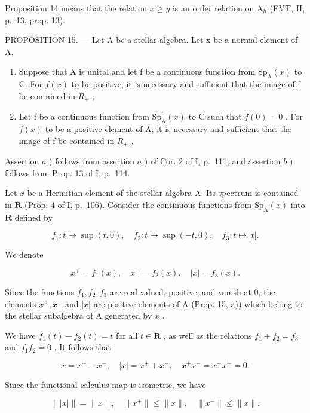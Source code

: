 Proposition 14 means that the relation \(x\geqslant y\) is an order relation on \(\mathrm{A}_h\) (EVT, II, p.~13, prop. 13).

PROPOSITION 15. — Let A be a stellar algebra. Let x be a normal element of A.

\begin{enumerate}
\def\labelenumi{\alph{enumi})}
\item
  Suppose that A is unital and let f be a continuous function from \(\mathrm{Sp}_{\mathrm{A}}(x)\) to C. For \(f(x)\) to be positive, it is necessary and sufficient that the image of f be contained in \(R_{+}\) ;
\item
  Let f be a continuous function from \(\mathrm{Sp}_{\mathrm{A}}^{\prime}(x)\) to C such that \(f(0)=0\) . For \(f(x)\) to be a positive element of A, it is necessary and sufficient that the image of f be contained in \(R_{+}\) .
\end{enumerate}

Assertion \(a\) ) follows from assertion \(a\) ) of Cor. 2 of I, p.~111, and assertion \(b\) ) follows from Prop. 13 of I, p.~114.

Let \(x\) be a Hermitian element of the stellar algebra A. Its spectrum is contained in \(\mathbf{R}\) (Prop. 4 of I, p.~106). Consider the continuous functions from \(\mathrm{Sp}_{\mathrm{A}}^{\prime}(x)\) into \(\mathbf{R}\) defined by

\[
f _ {1} \colon t \mapsto \sup (t, 0), \quad f _ {2} \colon t \mapsto \sup (- t, 0), \quad f _ {3} \colon t \mapsto | t |.
\]

We denote

\[
x ^ {+} = f _ {1} (x), \quad x ^ {-} = f _ {2} (x), \quad | x | = f _ {3} (x).\tag{3}
\]

Since the functions \(f_1, f_2, f_3\) are real-valued, positive, and vanish at 0, the elements \(x^+, x^-\) and \(|x|\) are positive elements of A (Prop. 15, a)) which belong to the stellar subalgebra of A generated by \(x\) .

We have \(f_{1}(t) - f_{2}(t) = t\) for all \(t \in \mathbf{R}\) , as well as the relations \(f_{1} + f_{2} = f_{3}\) and \(f_{1}f_{2} = 0\) . It follows that

\[
x = x ^ {+} - x ^ {-}, \quad | x | = x ^ {+} + x ^ {-}, \quad x ^ {+} x ^ {-} = x ^ {-} x ^ {+} = 0.\tag{4}
\]

Since the functional calculus map is isometric, we have

\[
\| | x | \| = \| x \|, \quad \| x ^ {+} \| \leqslant \| x \|, \quad \| x ^ {-} \| \leqslant \| x \|.
\]

